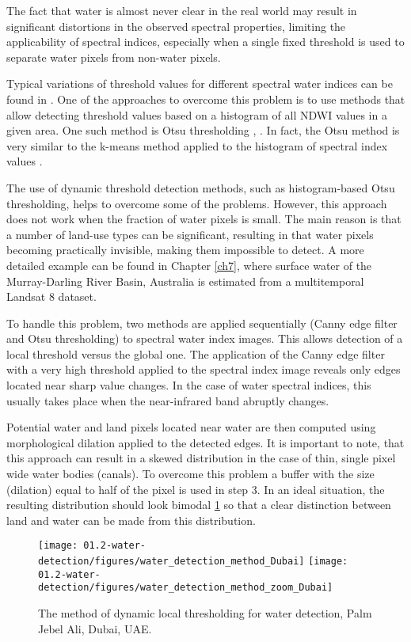 The fact that water is almost never clear in the real world may result in significant distortions in the observed spectral properties, limiting the applicability of spectral indices, especially when a single fixed threshold is used to separate water pixels from non-water pixels.

Typical variations of threshold values for different spectral water indices can be found in \citet{Ji2009}. One of the approaches to overcome this problem is to use methods that allow detecting threshold values based on a histogram of all NDWI values in a given area. One such method is Otsu thresholding \citet{Li2013}, \citet{Yang2014}. In fact, the Otsu method is very similar to the k-means method applied to the histogram of spectral index values \citet{Liu2009}.

The use of dynamic threshold detection methods, such as histogram-based Otsu thresholding, helps to overcome some of the problems. However, this approach does not work when the fraction of water pixels is small. The main reason is that a number of land-use types can be significant, resulting in that water pixels becoming practically invisible, making them impossible to detect. A more detailed example can be found in Chapter \ref{ch7}, where surface water of the Murray-Darling River Basin, Australia is estimated from a multitemporal Landsat 8 dataset.

To handle this problem, two methods are applied sequentially (Canny edge filter and Otsu thresholding) to spectral water index images. This allows detection of a local threshold versus the global one. The application of the Canny edge filter with a very high threshold applied to the spectral index image reveals only edges located near sharp value changes. In the case of water spectral indices, this usually takes place when the near-infrared band abruptly changes.

Potential water and land pixels located near water are then computed using morphological dilation applied to the detected edges. It is important to note, that this approach can result in a skewed distribution in the case of thin, single pixel wide water bodies (canals). To overcome this problem a buffer with the size (dilation) equal to half of the pixel is used in step 3. In an ideal situation, the resulting distribution should look bimodal \ref{fig:water_detection_method} so that a clear distinction between land and water can be made from this distribution.

\begin{figure}
	\centering
	\texttt{[image: 01.2-water-detection/figures/water\_detection\_method\_Dubai]}
	\texttt{[image: 01.2-water-detection/figures/water\_detection\_method\_zoom\_Dubai]}
	\caption{The method of dynamic local thresholding for water detection, Palm Jebel Ali, Dubai, UAE. }
	\label{fig:water_detection_method}
\end{figure}

